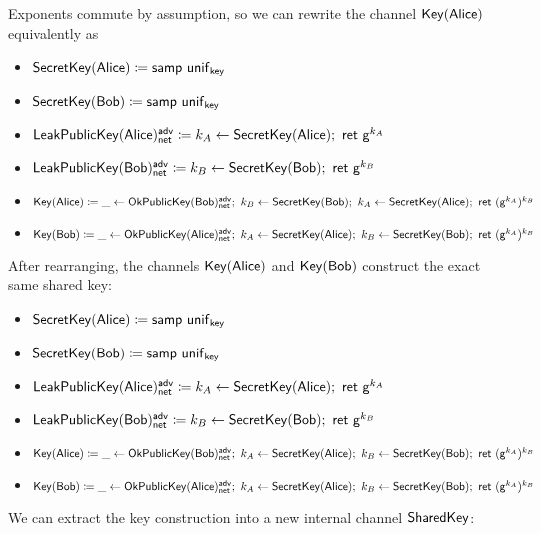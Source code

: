 \noindent Exponents commute by assumption, so we can rewrite the channel $\mathsf{Key}(\mathsf{Alice})$ equivalently as

\begin{itemize}
\item $\mathsf{SecretKey}(\mathsf{Alice}) \coloneqq \mathsf{samp} \ \mathsf{unif}_{\mathsf{key}}$
\item $\mathsf{SecretKey}(\mathsf{Bob}) \coloneqq \mathsf{samp} \ \mathsf{unif}_{\mathsf{key}}$
\item $\LeakPublicKey(\Alice)^\adv_\net \coloneqq k_A \leftarrow \SecretKey(\Alice); \ \ret{\gen^{k_A}}$
\item $\LeakPublicKey(\Bob)^\adv_\net \coloneqq k_B \leftarrow \SecretKey(\Bob); \ \ret{\gen^{k_B}}$
\item {\color{red} $\Key(\Alice) \coloneqq \_ \leftarrow \OkPublicKey(\Bob)^\adv_\net; \ k_B \leftarrow \SecretKey(\Bob); \ k_A \leftarrow \SecretKey(\Alice); \ \ret{(\gen^{k_A})}^{k_B}$}
\item $\Key(\Bob) \coloneqq \_ \leftarrow \OkPublicKey(\Alice)^\adv_\net; \ k_A \leftarrow \SecretKey(\Alice); \ k_B \leftarrow \SecretKey(\Bob); \ \ret{(\gen^{k_A})}^{k_B}$
\end{itemize}

\noindent After rearranging, the channels $\mathsf{Key}(\mathsf{Alice})$ and $\mathsf{Key}(\mathsf{Bob})$ construct the exact same shared key:

\begin{itemize}
\item $\mathsf{SecretKey}(\mathsf{Alice}) \coloneqq \mathsf{samp} \ \mathsf{unif}_{\mathsf{key}}$
\item $\mathsf{SecretKey}(\mathsf{Bob}) \coloneqq \mathsf{samp} \ \mathsf{unif}_{\mathsf{key}}$
\item $\LeakPublicKey(\Alice)^\adv_\net \coloneqq k_A \leftarrow \SecretKey(\Alice); \ \ret{\gen^{k_A}}$
\item $\LeakPublicKey(\Bob)^\adv_\net \coloneqq k_B \leftarrow \SecretKey(\Bob); \ \ret{\gen^{k_B}}$
\item {\color{red} $\Key(\Alice) \coloneqq \_ \leftarrow \OkPublicKey(\Bob)^\adv_\net; \ k_A \leftarrow \SecretKey(\Alice); \ k_B \leftarrow \SecretKey(\Bob); \ \ret{(\gen^{k_A})^{k_B}}$}
\item $\Key(\Bob) \coloneqq \_ \leftarrow \OkPublicKey(\Alice)^\adv_\net; \ k_A \leftarrow \SecretKey(\Alice); \ k_B \leftarrow \SecretKey(\Bob); \ \ret{(\gen^{k_A})^{k_B}}$
\end{itemize}

\noindent We can extract the key construction into a new internal channel $\mathsf{SharedKey}$:


